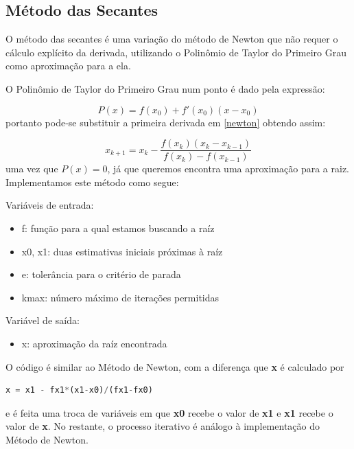\documentclass{article}
\begin{document}

\subsection{M\'{e}todo das Secantes}
O m\'{e}todo das secantes \'{e} uma varia\c{c}\~{a}o do m\'{e}todo de Newton que n\~{a}o requer o c\'{a}lculo expl\'{i}cito da derivada, utilizando o Polinômio de Taylor do Primeiro Grau como aproximação para a ela. 

O Polinômio de Taylor do Primeiro Grau num ponto é dado pela expressão: 

$$P(x) = f(x_0) + f'(x_0)(x-x_0)$$
portanto pode-se substituir a primeira derivada em \eqref{newton} obtendo assim:

\begin{equation}
    x_{k+1} = x_k - \frac{f(x_k)(x_{k}-x_{k-1})}{f(x_k)-f(x_{k-1})}
\end{equation}
uma vez que $P(x)=0$, já que queremos encontra uma aproximação para a raiz.\\

Implementamos este m\'{e}todo como segue:

Vari\'{a}veis de entrada:


\begin{itemize}
    \item f: fun\c{c}\~{a}o para a qual estamos buscando a ra\'{i}z
    \item x0, x1: duas estimativas iniciais pr\'{o}ximas \`{a} ra\'{i}z
    \item e: toler\^{a}ncia para o crit\'{e}rio de parada
    \item kmax: n\'{u}mero m\'{a}ximo de itera\c{c}\~{o}es permitidas
\end{itemize}

Vari\'{a}vel de sa\'{i}da:
\begin{itemize}
    \item x: aproxima\c{c}\~{a}o da ra\'{i}z encontrada
\end{itemize}

O código é similar ao Método de Newton, com a diferença que \textbf{x} é calculado por
\begin{lstlisting}[language=Python]
    x = x1 - fx1*(x1-x0)/(fx1-fx0)
\end{lstlisting}
e é feita uma troca de variáveis em que \textbf{x0} recebe o valor de \textbf{x1} e \textbf{x1} recebe o valor de \textbf{x}. No restante, o processo iterativo é análogo à implementação do Método de Newton.
\end{document}
